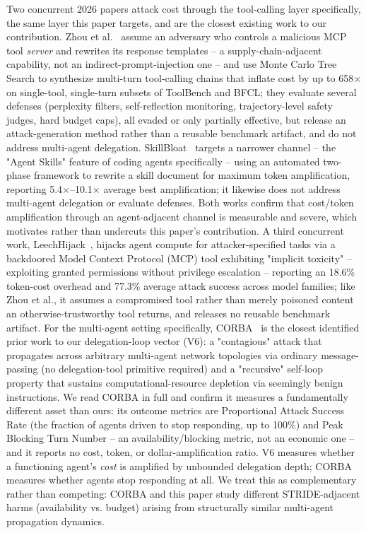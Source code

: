 \documentclass[conference]{IEEEtran}
\begin{document}
Two concurrent 2026 papers attack cost through the tool-calling layer specifically, the same layer this paper targets, and are the closest existing work to our contribution. Zhou et al.~\cite{zhou2026toolchain} assume an adversary who controls a malicious MCP tool \emph{server} and rewrites its response templates -- a supply-chain-adjacent capability, not an indirect-prompt-injection one -- and use Monte Carlo Tree Search to synthesize multi-turn tool-calling chains that inflate cost by up to 658$\times$ on single-tool, single-turn subsets of ToolBench and BFCL; they evaluate several defenses (perplexity filters, self-reflection monitoring, trajectory-level safety judges, hard budget caps), all evaded or only partially effective, but release an attack-generation method rather than a reusable benchmark artifact, and do not address multi-agent delegation. SkillBloat~\cite{skillbloat2026} targets a narrower channel -- the "Agent Skills" feature of coding agents specifically -- using an automated two-phase framework to rewrite a skill document for maximum token amplification, reporting 5.4$\times$--10.1$\times$ average best amplification; it likewise does not address multi-agent delegation or evaluate defenses. Both works confirm that cost/token amplification through an agent-adjacent channel is measurable and severe, which motivates rather than undercuts this paper's contribution. A third concurrent work, LeechHijack~\cite{leechhijack2025}, hijacks agent compute for attacker-specified tasks via a backdoored Model Context Protocol (MCP) tool exhibiting "implicit toxicity" -- exploiting granted permissions without privilege escalation -- reporting an 18.6\% token-cost overhead and 77.3\% average attack success across model families; like Zhou et al., it assumes a compromised tool rather than merely poisoned content an otherwise-trustworthy tool returns, and releases no reusable benchmark artifact. For the multi-agent setting specifically, CORBA~\cite{corba2025} is the closest identified prior work to our delegation-loop vector (V6): a "contagious" attack that propagates across arbitrary multi-agent network topologies via ordinary message-passing (no delegation-tool primitive required) and a "recursive" self-loop property that sustains computational-resource depletion via seemingly benign instructions. We read CORBA in full and confirm it measures a fundamentally different asset than ours: its outcome metrics are Proportional Attack Success Rate (the fraction of agents driven to stop responding, up to 100\%) and Peak Blocking Turn Number -- an availability/blocking metric, not an economic one -- and it reports no cost, token, or dollar-amplification ratio. V6 measures whether a functioning agent's \emph{cost} is amplified by unbounded delegation depth; CORBA measures whether agents stop responding at all. We treat this as complementary rather than competing: CORBA and this paper study different STRIDE-adjacent harms (availability vs. budget) arising from structurally similar multi-agent propagation dynamics.
\end{document}
